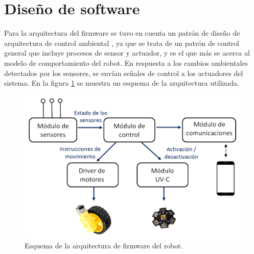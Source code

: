 

\section{Diseño de software}

Para la arquitectura del firmware se tuvo en cuenta un patrón de diseño de arquitectura de control ambiental \citep{arq}, ya que se trata de un patrón de control general que incluye procesos de sensor y actuador, y es el que más se acerca al modelo de comportamiento del robot. En respuesta a los cambios ambientales detectados por los sensores, se envían señales de control a los actuadores del sistema. En la figura \ref{fig:arq2} se muestra un esquema de la arquitectura utilizada.

\begin{figure}[h]
	\centering
	\includegraphics[width=13cm]{./Figures/arquitectura.PNG}
	\caption{Esquema de la arquitectura de firmware del robot.}
	\label{fig:arq2}
\end{figure}


